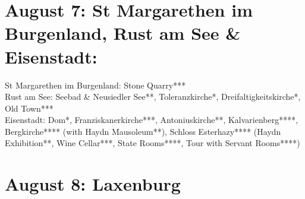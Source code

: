 {\section{August 7: St Margarethen im Burgenland, Rust am See \& Eisenstadt:}
\label{2021Eisenstadt}

St Margarethen im Burgenland: Stone Quarry***\\
Rust am See: Seebad \& Neusiedler See**, Toleranzkirche*, Dreifaltigkeitskirche*, Old Town***\\
Eisenstadt: Dom*, Franziskanerkirche***, Antoniuskirche**, Kalvarienberg****, Bergkirche**** (with Haydn Mausoleum**), Schloss Esterhazy**** (Haydn Exhibition**, Wine Cellar***, State Rooms****, Tour with Servant Rooms****)\\

\section{August 8: Laxenburg}
\label{2021Laxenburg}

}

